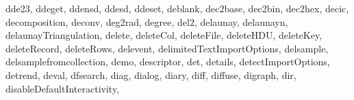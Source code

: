{{        dde23,%
        ddeget,%
        ddensd,%
        ddesd,%
        ddeset,%
        deblank,%
        dec2base,%
        dec2bin,%
        dec2hex,%
        decic,%
        decomposition,%
        deconv,%
        deg2rad,%
        degree,%
        del2,%
        delaunay,%
        delaunayn,%
        delaunayTriangulation,%
        delete,%
        deleteCol,%
        deleteFile,%
        deleteHDU,%
        deleteKey,%
        deleteRecord,%
        deleteRows,%
        delevent,%
        delimitedTextImportOptions,%
        delsample,%
        delsamplefromcollection,%
        demo,%
        descriptor,%
        det,%
        details,%
        detectImportOptions,%
        detrend,%
        deval,%
        dfsearch,%
        diag,%
        dialog,%
        diary,%
        diff,%
        diffuse,%
        digraph,%
        dir,%
        disableDefaultInteractivity,%
}}
